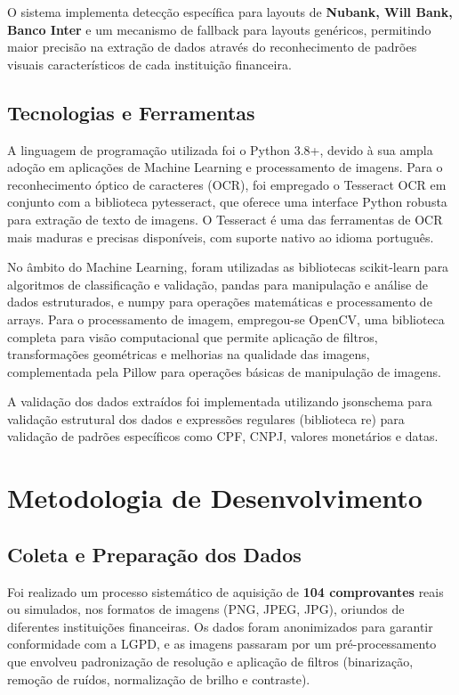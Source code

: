 O sistema implementa detecção específica para layouts de \textbf{Nubank, Will Bank, Banco Inter} e um mecanismo de fallback para layouts genéricos, permitindo maior precisão na extração de dados através do reconhecimento de padrões visuais característicos de cada instituição financeira.

\subsection{Tecnologias e Ferramentas}

A linguagem de programação utilizada foi o Python 3.8+, devido à sua ampla adoção em aplicações de Machine Learning e processamento de imagens. Para o reconhecimento óptico de caracteres (OCR), foi empregado o Tesseract OCR em conjunto com a biblioteca pytesseract, que oferece uma interface Python robusta para extração de texto de imagens. O Tesseract é uma das ferramentas de OCR mais maduras e precisas disponíveis, com suporte nativo ao idioma português.

No âmbito do Machine Learning, foram utilizadas as bibliotecas scikit-learn para algoritmos de classificação e validação, pandas para manipulação e análise de dados estruturados, e numpy para operações matemáticas e processamento de arrays. Para o processamento de imagem, empregou-se OpenCV, uma biblioteca completa para visão computacional que permite aplicação de filtros, transformações geométricas e melhorias na qualidade das imagens, complementada pela Pillow para operações básicas de manipulação de imagens.

A validação dos dados extraídos foi implementada utilizando jsonschema para validação estrutural dos dados e expressões regulares (biblioteca re) para validação de padrões específicos como CPF, CNPJ, valores monetários e datas.

\section{Metodologia de Desenvolvimento}

\subsection{Coleta e Preparação dos Dados}

Foi realizado um processo sistemático de aquisição de \textbf{104 comprovantes} reais ou simulados, nos formatos de imagens (PNG, JPEG, JPG), oriundos de diferentes instituições financeiras. Os dados foram anonimizados para garantir conformidade com a LGPD, e as imagens passaram por um pré-processamento que envolveu padronização de resolução e aplicação de filtros (binarização, remoção de ruídos, normalização de brilho e contraste).

